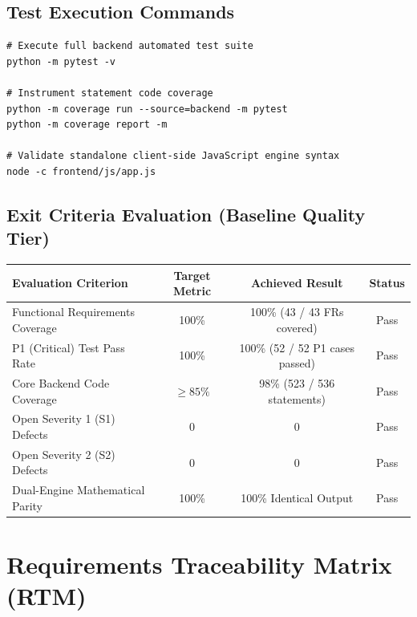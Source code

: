 \documentclass[12pt,a4paper]{report}
\begin{document}
\section{Test Execution Commands}
\begin{verbatim}
# Execute full backend automated test suite
python -m pytest -v

# Instrument statement code coverage
python -m coverage run --source=backend -m pytest
python -m coverage report -m

# Validate standalone client-side JavaScript engine syntax
node -c frontend/js/app.js
\end{verbatim}

\section{Exit Criteria Evaluation (Baseline Quality Tier)}
\begin{table}[ht]
\centering
\begin{tabularx}{\textwidth}{X c c c}
\toprule
\textbf{Evaluation Criterion} & \textbf{Target Metric} & \textbf{Achieved Result} & \textbf{Status} \\
\midrule
Functional Requirements Coverage & 100\% & 100\% (43 / 43 FRs covered) & Pass \\
P1 (Critical) Test Pass Rate & 100\% & 100\% (52 / 52 P1 cases passed) & Pass \\
Core Backend Code Coverage & $\ge 85\%$ & 98\% (523 / 536 statements) & Pass \\
Open Severity 1 (S1) Defects & 0 & 0 & Pass \\
Open Severity 2 (S2) Defects & 0 & 0 & Pass \\
Dual-Engine Mathematical Parity & 100\% & 100\% Identical Output & Pass \\
\bottomrule
\end{tabularx}
\end{table}

\newpage

\chapter{Requirements Traceability Matrix (RTM)}
\end{document}
